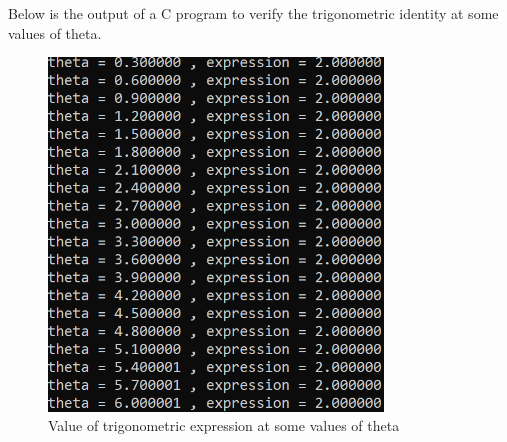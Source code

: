 \documentclass[journal,12pt,twocolumn]{IEEEtran}
\begin{document}
Below is the output of a C program to verify the trigonometric identity at some values of theta.
\begin{figure}[H]
\includegraphics[width=3.5in]{fig.png}
\caption{Value of trigonometric expression at some values of theta}
\end{figure}
\end{document}
